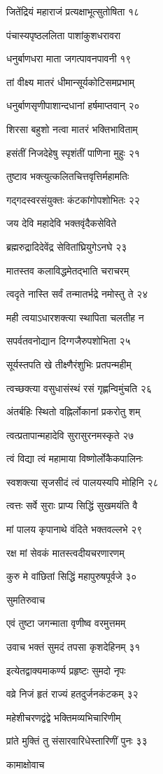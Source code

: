 जितेंद्रियं महाराजं प्रत्यक्षाभूत्सुतोषिता १८

पंचास्यपृष्ठललिता पाशांकुशधरावरा

धनुर्बाणधरा माता जगत्पावनपावनी १९

तां वीक्ष्य मातरं धीमान्सूर्यकोटिसमप्रभाम्

धनुर्बाणसृणीपाशान्दधानां हर्षमाप्तवान् २०

शिरसा बहुशो नत्वा मातरं भक्तिभाविताम्

हसंतीं निजदेहेषु स्पृशंतीं पाणिना मुहुः २१

तुष्टाव भक्त्युत्कलितचित्तवृत्तिर्महामतिः

गद्गदस्वरसंयुक्तः कंटकांगोपशोभितः २२

जय देवि महादेवि भक्तवृंदैकसेविते

ब्रह्मरुद्रादिदेवेंद्र सेवितांघ्रियुगेऽनघे २३

मातस्तव कलाविद्धमेतद्भाति चराचरम्

त्वदृते नास्ति सर्वं तन्मातर्भद्रे नमोस्तु ते २४

मही त्वयाऽधारशक्त्या स्थापिता चलतीह न

सपर्वतवनोद्यान दिग्गजैरुपशोभिता २५

सूर्यस्तपति खे तीक्ष्णैरंशुभिः प्रतपन्महीम्

त्वच्छक्त्या वसुधासंस्थं रसं गृह्णन्विमुंचति २६

अंतर्बहिः स्थितो वह्निर्लोकानां प्रकरोतु शम्

त्वत्प्रतापान्महादेवि सुरासुरनमस्कृते २७

त्वं विद्या त्वं महामाया विष्णोर्लोकैकपालिनः

स्वशक्त्या सृजसीदं त्वं पालयस्यपि मोहिनि २८

त्वत्तः सर्वे सुराः प्राप्य सिद्धिं सुखमयंति वै

मां पालय कृपानाथे वंदिते भक्तवल्लभे २९

रक्ष मां सेवकं मातस्त्वदीयचरणारणम्

कुरु मे वांछितां सिद्धिं महापुरुषपूर्वजे ३०

सुमतिरुवाच

एवं तुष्टा जगन्माता वृणीष्व वरमुत्तमम्

उवाच भक्तं सुमदं तपसा कृशदेहिनम् ३१

इत्येतद्वाक्यमाकर्ण्य प्रहृष्टः सुमदो नृपः

वव्रे निजं हृतं राज्यं हतदुर्जनकंटकम् ३२

महेशीचरणद्वंद्वे भक्तिमव्यभिचारिणीम्

प्रांते मुक्तिं तु संसारवारिधेस्तारिणीं पुनः ३३

कामाक्षोवाच

